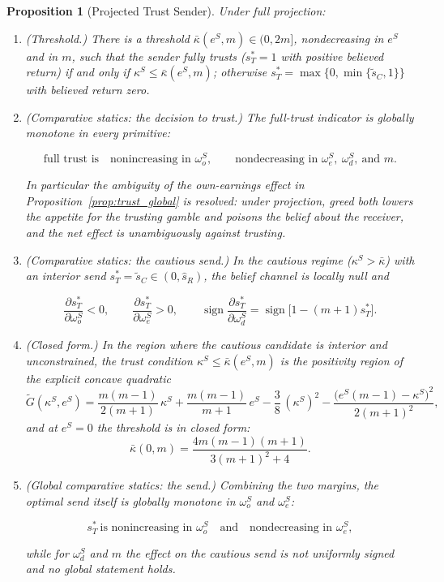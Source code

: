 \documentclass[11pt]{article}
\theoremstyle{plain}
\newtheorem{proposition}{Proposition}
\theoremstyle{remark}
\newcommand{\sgn}{\operatorname{sign}}
\begin{document}
\begin{proposition}[Projected Trust Sender]
\label{prop:trust_projection}
Under full projection:
\begin{enumerate}[topsep=2pt,itemsep=2pt]
\item \emph{(Threshold.)}  There is a threshold $\bar\kappa(e^S,m)\in(0,2m]$, nondecreasing in $e^S$ and in $m$, such that the sender fully trusts ($s_T^\ast=1$ with positive believed return) if and only if $\kappa^S\le\bar\kappa(e^S,m)$; otherwise $s_T^\ast=\max\{0,\min\{\tilde s_C,1\}\}$ with believed return zero.
\item \emph{(Comparative statics: the decision to trust.)}  The full-trust indicator is globally monotone in every primitive:
\begin{csbox}
\[
        \text{full trust is}\quad
        \text{nonincreasing in }\omega_o^S,
        \qquad
        \text{nondecreasing in }\omega_e^S,\ \omega_d^S,\ \text{and }m.
\]
\end{csbox}
In particular the ambiguity of the own-earnings effect in Proposition~\ref{prop:trust_global} is resolved: under projection, greed both lowers the appetite for the trusting gamble and poisons the belief about the receiver, and the net effect is unambiguously against trusting.
\item \emph{(Comparative statics: the cautious send.)}  In the cautious regime ($\kappa^S>\bar\kappa$) with an interior send $s_T^\ast=\tilde s_C\in(0,\hat s_R)$, the belief channel is locally null and
\begin{csbox}
\[
        \frac{\partial s_T^\ast}{\partial \omega_o^S}<0,
        \qquad
        \frac{\partial s_T^\ast}{\partial \omega_e^S}>0,
        \qquad
        \sgn\frac{\partial s_T^\ast}{\partial \omega_d^S}
        =
        \sgn\big[1-(m+1)s_T^\ast\big].
\]
\end{csbox}
\item \emph{(Closed form.)}  In the region where the cautious candidate is interior and unconstrained, the trust condition $\kappa^S\le\bar\kappa(e^S,m)$ is the positivity region of the explicit concave quadratic
\[
        \tilde G(\kappa^S,e^S)
        =
        \frac{m(m-1)}{2(m+1)}\,\kappa^S
        +\frac{m(m-1)}{m+1}\,e^S
        -\frac38\,(\kappa^S)^2
        -\frac{\big(e^S(m-1)-\kappa^S\big)^2}{2(m+1)^2},
\]
and at $e^S=0$ the threshold is in closed form:
\[
        \bar\kappa(0,m)=\frac{4m(m-1)(m+1)}{3(m+1)^2+4}.
\]
\item \emph{(Global comparative statics: the send.)}  Combining the two margins, the optimal send itself is globally monotone in $\omega_o^S$ and $\omega_e^S$:
\begin{csbox}
\[
        s_T^\ast\ \text{is nonincreasing in }\omega_o^S
        \quad\text{and}\quad
        \text{nondecreasing in }\omega_e^S,
\]
\end{csbox}
while for $\omega_d^S$ and $m$ the effect on the cautious send is not uniformly signed and no global statement holds.
\end{enumerate}
\end{proposition}
\end{document}
